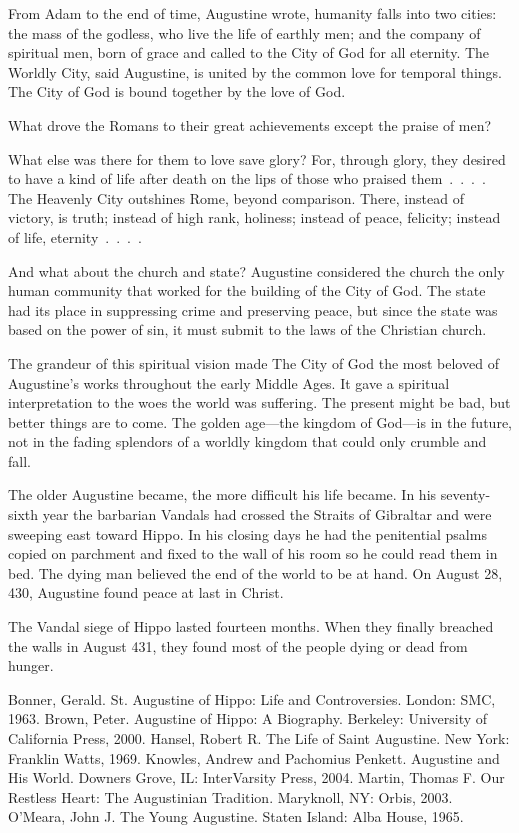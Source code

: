 From Adam to the end of time, Augustine wrote, humanity falls into two cities: the mass of the
godless, who live the life of earthly men; and the company of spiritual men, born of grace and
called to the City of God for all eternity. The Worldly City, said Augustine, is united by the
common love for temporal things. The City of God is bound together by the love of God.

What drove the Romans to their great achievements except the praise of men?

\begin{blockquote}
What else was there for them to love save glory? For, through glory, they desired to have a kind of
life after death on the lips of those who praised them~.~.~.~. The Heavenly City outshines Rome,
beyond comparison. There, instead of victory, is truth; instead of high rank, holiness; instead of
peace, felicity; instead of life, eternity~.~.~.~.
\end{blockquote}

And what about the church and state? Augustine considered the church the only human community that
worked for the building of the City of God. The state had its place in suppressing crime and
preserving peace, but since the state was based on the power of sin, it must submit to the laws of
the Christian church.

The grandeur of this spiritual vision made The City of God the most beloved of Augustine’s works
throughout the early Middle Ages. It gave a spiritual interpretation to the woes the world was
suffering. The present might be bad, but better things are to come. The golden age—the kingdom of
God—is in the future, not in the fading splendors of a worldly kingdom that could only crumble and
fall.

The older Augustine became, the more difficult his life became. In his seventy-sixth year the
barbarian Vandals had crossed the Straits of Gibraltar and were sweeping east toward Hippo. In his
closing days he had the penitential psalms copied on parchment and fixed to the wall of his room so
he could read them in bed. The dying man believed the end of the world to be at hand. On August 28,
430, Augustine found peace at last in Christ.

The Vandal siege of Hippo lasted fourteen months. When they finally breached the walls in August
431, they found most of the people dying or dead from hunger.

\begin{readinglist}
\entry *Bonner, Gerald. St. Augustine of Hippo: Life and Controversies. London: SMC, 1963.
\entry Brown, Peter. Augustine of Hippo: A Biography. Berkeley: University of California Press,
  2000.
\entry Hansel, Robert R. The Life of Saint Augustine. New York: Franklin Watts, 1969.
\entry Knowles, Andrew and Pachomius Penkett. Augustine and His World. Downers Grove, IL:
  InterVarsity Press, 2004.
\entry Martin, Thomas F. Our Restless Heart: The Augustinian Tradition. Maryknoll, NY: Orbis, 2003.
\entry O’Meara, John J. The Young Augustine. Staten Island: Alba House, 1965.
\end{readinglist}

